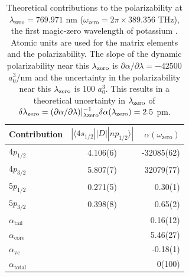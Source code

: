 \begin{table}
\caption[Theoretical contributions to the polarizability at the first magic-zero wavelength of potassium.]{\label{kMZWcontTable}Theoretical contributions to the polarizability at $\lambda_\textrm{zero}=769.971$ nm ($\omega_\textrm{zero} = 2\pi\times389.356$ THz), the first magic-zero wavelength of potassium \cite{Saf12per}. Atomic units are used for the matrix elements and the polarizability. The slope of the dynamic polarizability near this $\lambda_\textrm{zero}$ is $\partial \alpha / \partial \lambda = -42500$ $a_0^3$/nm and the uncertainty in the polarizability near this $\lambda_\textrm{zero}$ is 100 $a_0^3$. This results in a theoretical uncertainty in $\lambda_\textrm{zero}$ of $\delta\lambda_\textrm{zero} = (\partial \alpha/ \partial \lambda)|^{-1}_{\lambda\textrm{zero}} \delta\alpha(\lambda_\textrm{zero})= 2.5$ pm.}
\begin{center}
\begin{tabular}{l c r}
\hline\hline
Contribution & $|\langle 4s_{1/2} || D || np_{1/2} \rangle|$ & $\alpha(\omega_\textrm{zero})$ \\
\hline
$4p_{1/2}$ & 4.106(6) & -32085(62) \\
$4p_{3/2}$ & 5.807(7) & 32079(77) \\
$5p_{1/2}$ & 0.271(5) & 0.30(1) \\
$5p_{3/2}$ & 0.398(8) & 0.65(2) \\
$\alpha_\textrm{tail}$ & & 0.16(12) \\
$\alpha_\textrm{core}$ & & 5.46(27)\\
$\alpha_\textrm{vc}$ & & -0.18(1) \\
\hline
$\alpha_\textrm{total}$ & & 0(100)\\
\end{tabular}
\end{center}
\end{table}



